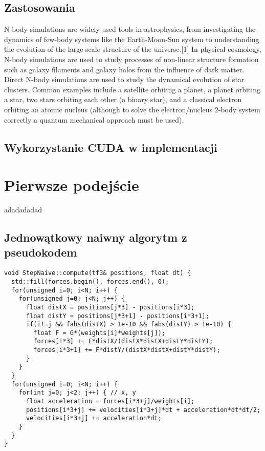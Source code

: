 \documentclass[13pt,twoside,a4paper]{article}
\begin{document}
\subsection{\Large Zastosowania}

 N-body simulations are widely used tools in astrophysics, from investigating the dynamics of few-body systems like the Earth-Moon-Sun system to understanding the evolution of the large-scale structure of the universe.[1] In physical cosmology, N-body simulations are used to study processes of non-linear structure formation such as galaxy filaments and galaxy halos from the influence of dark matter. Direct N-body simulations are used to study the dynamical evolution of star clusters. Common examples include a satellite orbiting a planet, a planet orbiting a star, two stars orbiting each other (a binary star), and a classical electron orbiting an atomic nucleus (although to solve the electron/nucleus 2-body system correctly a quantum mechanical approach must be used).

\subsection{\Large Wykorzystanie CUDA w implementacji}


\section{\LARGE Pierwsze podejście}
\bigskip
\bigskip

adadadadad

\subsection{\Large Jednowątkowy naiwny algorytm z pseudokodem}

\begin{lstlisting}[frame=single, framerule=2pt, caption=compute next step]
void StepNaive::compute(tf3& positions, float dt) {
  std::fill(forces.begin(), forces.end(), 0);
  for(unsigned i=0; i<N; i++) {
    for(unsigned j=0; j<N; j++) {
      float distX = positions[j*3] - positions[i*3];
      float distY = positions[j*3+1] - positions[i*3+1];
      if(i!=j && fabs(distX) > 1e-10 && fabs(distY) > 1e-10) {
        float F = G*(weights[i]*weights[j]);
        forces[i*3] += F*distX/(distX*distX+distY*distY);
        forces[i*3+1] += F*distY/(distX*distX+distY*distY);
      }
    }
  }
  for(unsigned i=0; i<N; i++) {
    for(int j=0; j<2; j++) { // x, y
      float acceleration = forces[i*3+j]/weights[i];
      positions[i*3+j] += velocities[i*3+j]*dt + acceleration*dt*dt/2;
      velocities[i*3+j] += acceleration*dt;
    }
  }
}

\end{lstlisting}
\end{document}
